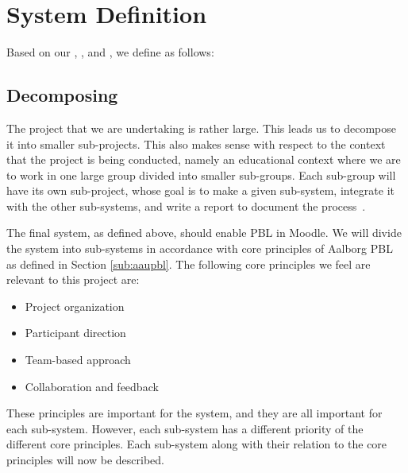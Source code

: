 \chapter{System Definition}
\label{sec:systemDef}
\label{chap:systemDef}
Based on our , , and , we define \system{} as follows:


\section{Decomposing \system}
\label{sub:decomposingSys}
The project that we are undertaking is rather large.
This leads us to decompose it into smaller sub-projects.
This also makes sense with respect to the context that the project is being conducted, namely an educational context where we are to work in one large group divided into smaller sub-groups. 
Each sub-group will have its own sub-project, whose goal is to make a given sub-system, integrate it with the other sub-systems, and write a report to document the process~\cite{sw6studieordning}.

The final system, as defined above, should enable PBL in Moodle.
We will divide the system into sub-systems in accordance with core principles of Aalborg PBL as defined in Section \ref{sub:aaupbl}.
The following core principles we feel are relevant to this project are:

\begin{itemize}
	\item Project organization
  \item Participant direction
  \item Team-based approach
  \item Collaboration and feedback
\end{itemize}

These principles are important for the system, and they are all important for each sub-system.
However, each sub-system has a different priority of the different core principles.%
Each sub-system along with their relation to the core principles will now be described.


